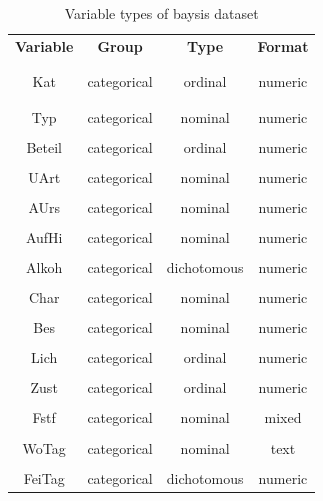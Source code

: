 \documentclass[a4paper,headsepline,footsepline,fontsize=11pt,BCOR=12mm,DIV=12]{report}
\begin{document}
\begin{table}[ht]
	\centering
	\begin{tabular}{c|c|c|c}
		\textbf{Variable} 	& \textbf{Group} 	& \textbf{Type} 		& \textbf{Format} \\
		\\[-1em]
		\hline
		\\[-1em]
		Kat  		& categorical 	& ordinal 	& numeric\\
		\\[-1em]
		\hline
		\\[-1em]
		Typ 		& categorical 	& nominal	& numeric\\
		\hline
		\\[-1em]
		Beteil 		& categorical 	& ordinal	& numeric\\
		\hline
		\\[-1em]
		UArt 		& categorical 	& nominal	& numeric\\
		\hline
		\\[-1em]
		AUrs 		& categorical 	& nominal	& numeric\\
		\hline
		\\[-1em]
		AufHi 		& categorical 	& nominal	& numeric\\
		\hline
		\\[-1em]
		Alkoh 		& categorical 	& dichotomous	& numeric\\
		\hline
		\\[-1em]
		Char 		& categorical 	& nominal	& numeric\\
		\hline
		\\[-1em]
		Bes 		& categorical 	& nominal	& numeric\\
		\hline
		\\[-1em]
		Lich 		& categorical 	& ordinal	& numeric\\
		\hline
		\\[-1em]
		Zust 		& categorical 	& ordinal	& numeric\\
		\hline
		\\[-1em]
		Fstf 		& categorical 	& nominal	& mixed\\
		\hline
		\\[-1em]
		WoTag 		& categorical 	& nominal	& text\\
		\hline
		\\[-1em]
		FeiTag 		& categorical 	& dichotomous	& numeric\\
	\end{tabular}
	\caption{Variable types of \acrshort{baysis} dataset}
	\label{tab:table_baysis_paramters}
\end{table}
\end{document}
